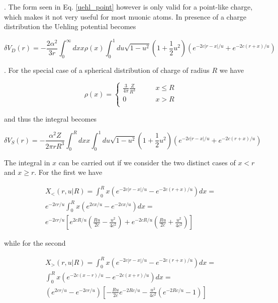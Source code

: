 \documentclass[]{report}
\begin{document}
. The form seen in Eq. \ref{uehl_point} however is only valid for a point-like charge, which makes it not very useful for most muonic atoms. In presence of a charge distribution the Uehling potential becomes

\begin{equation}\label{uehl_distr}
\delta V_D(r) = -\frac{2\alpha^2}{3 r}\int_0^\infty dx x \rho(x)\int_0^1 du \sqrt{1-u^2}\left(1+\frac{1}{2}u^2\right)\left(e^{-2c|r-x|/u}+e^{-2c(r+x)/u}\right)
\end{equation}

. For the special case of a spherical distribution of charge of radius $R$ we have

\begin{equation}
\rho(x) = \begin{cases}
\frac{3}{4\pi}\frac{Z}{R^3} \qquad &x \leq R \\
0 \qquad &x > R \\
\end{cases}
\end{equation}

and thus the integral becomes

\begin{equation}\label{uehl_sphere}
\delta V_S(r) = -\frac{\alpha^2Z}{2\pi rR^3}\int_0^R dx x \int_0^1 du \sqrt{1-u^2}\left(1+\frac{1}{2}u^2\right)\left(e^{-2c|r-x|/u}+e^{-2c(r+x)/u}\right)
\end{equation}

The integral in $x$ can be carried out if we consider the two distinct cases of $x < r$ and $x \geq r$. For the first we have

\begin{multline}\label{intx_less}
X_{<}(r, u | R) = \int_0^R x \left(e^{-2c|r-x|/u}-e^{-2c(r+x)/u}\right)  dx = \\
e^{-2cr/u}\int_0^R x \left(e^{2cx/u}-e^{-2cx/u}\right)  dx = \\ e^{-2cr/u}\left[e^{2cR/u}\left(\frac{Ru}{2c}-\frac{u^2}{4c^2}\right)+e^{-2cR/u}\left(\frac{Ru}{2c}+\frac{u^2}{4c^2}\right)\right]
\end{multline}

while for the second

\begin{multline}\label{intx_more}
X_{>}(r, u | R) =\int_0^R x \left(e^{-2c|r-x|/u}-e^{-2c(r+x)/u}\right)  dx = \\
\int_0^R x \left(e^{-2c(x-r)/u}-e^{-2c(x+r)/u}\right)  dx = \\ \left(e^{2cr/u}-e^{-2cr/u}\right)\left[-\frac{Ru}{2c}e^{-2Rc/u}-\frac{u^2}{4c^2}(e^{-2Rc/u}-1)\right]
\end{multline}
\end{document}
